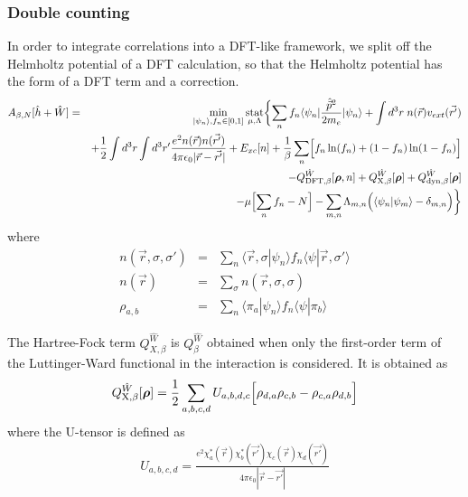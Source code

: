 \documentclass[11pt,a4paper]{report}
\begin{document}
\subsubsection{Double counting}
In order to integrate correlations into a DFT-like framework, we split
off the Helmholtz potential of a DFT calculation, so that the
Helmholtz potential has the form of a DFT term and a correction.
\begin{eqnarray}
A_{\beta,N}[\hat{h}+\hat{W}]
&=&\min_{|\psi_n\rangle,f_n\in[0,1]}\operatorname*{stat}_{\mu,\Lambda}
\biggl\lbrace
\sum_n f_n\langle\psi_n|\frac{\hat{\vec{p}}^2}{2m_e}|\psi_n\rangle
+\int d^3r\;n(\vec{r})v_{ext}(\vec{r'})
\nonumber\\
&&+\frac{1}{2}\int d^3r\int d^3r'
\frac{e^2n(\vec{r})n(\vec{r'})}{4\pi\epsilon_0|\vec{r}-\vec{r'}|}
+E_{xc}[n]
+\frac{1}{\beta}\sum_n\Bigl[f_n\ln(f_n)+(1-f_n)\ln(1-f_n)\Bigr]
\nonumber\\
&&-Q_{\text{DFT},\beta}^{\hat{W}}[\bm{\rho},n]
  +Q_{\text{X},\beta}^{\hat{W}}[\bm{\rho}]
  +Q_{\text{dyn},\beta}^{\hat{W}}[\bm{\rho}]
\nonumber\\
&&
-\mu\Bigl[\sum_n f_n-N\Bigr]
-\sum_{m,n}\Lambda_{m,n}\Bigl(\langle\psi_n|\psi_m\rangle-\delta_{m,n}\Bigr)
\biggr\rbrace
\label{eq:hp}
\end{eqnarray}
where 
\begin{eqnarray}
n(\vec{r},\sigma,\sigma')&=&
\sum_n\langle\vec{r},\sigma|\psi_n\rangle 
f_n\langle\psi|\vec{r},\sigma'\rangle 
\nonumber\\
n(\vec{r})&=&\sum_\sigma n(\vec{r},\sigma,\sigma)
\nonumber\\
\rho_{a,b}&=&\sum_n\langle\pi_a|\psi_n\rangle 
f_n\langle\psi|\pi_b\rangle 
\end{eqnarray}

The Hartree-Fock term $Q^{\hat{W}}_{X,\beta}$ is $Q^{\hat{W}}_\beta$
  obtained when only the first-order term of the Luttinger-Ward
  functional in the interaction is considered.
It is obtained as
\begin{eqnarray}
Q_{\text{X},\beta}^{\hat{W}}[\bm{\rho}]
=\frac{1}{2}\sum_{a,b,c,d}U_{a,b,d,c}
\Bigl[\rho_{d,a}\rho_{c,b}-\rho_{c,a}\rho_{d,b}\Bigr]
\end{eqnarray}
where the U-tensor is defined as
\begin{eqnarray}
U_{a,b,c,d}=\frac{e^2\chi^*_a(\vec{r})\chi^*_b(\vec{r'})
\chi_c(\vec{r})\chi_d(\vec{r'})}{4\pi\epsilon_0|\vec{r}-\vec{r'}|}
\end{eqnarray}
\end{document}
